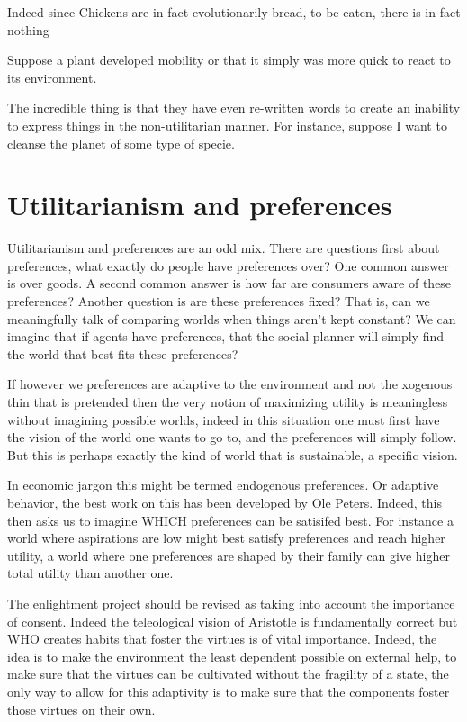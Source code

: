 Indeed since Chickens are in fact evolutionarily bread, to be eaten, there is in fact nothing 

Suppose a plant developed mobility or that it simply was more quick to react to its environment. 

The incredible thing is that they have even re-written words to create an inability to express things in the non-utilitarian manner. For instance, suppose I want to cleanse the planet of some type of specie. 


\section{Utilitarianism and preferences}

Utilitarianism and preferences are an odd mix. There are questions first about preferences, what exactly do people have preferences over? One common answer is over goods. A second common answer is how far are consumers aware of these preferences? Another question is are these preferences fixed? That is, can we meaningfully talk of comparing worlds when things aren't kept constant? We can imagine that if agents have preferences, that the social planner will simply find the world that best fits these preferences? 

If however we preferences are adaptive to the environment and not the xogenous thin that is pretended then the very notion of maximizing utility is meaningless without imagining possible worlds, indeed in this situation one must first have the vision of the world one wants to go to, and the preferences will simply follow. But this is perhaps exactly the kind of world that is sustainable, a specific vision. 

In economic jargon this might be termed endogenous preferences. Or adaptive behavior, the best work on this has been developed by Ole Peters. Indeed, this then asks us to imagine WHICH preferences can be satisifed best. For instance a world where aspirations are low might best satisfy preferences and reach higher utility, a world where one preferences are shaped by their family can give higher total utility than another one. 

The enlightment project should be revised as taking into account the importance of consent. Indeed the teleological vision of Aristotle is fundamentally correct but WHO creates habits that foster the virtues is of vital importance. Indeed, the idea is to make the environment the least dependent possible on external help, to make sure that the virtues can be cultivated without the fragility of a state, the only way to allow for this adaptivity is to make sure that the components foster those virtues on their own. 

